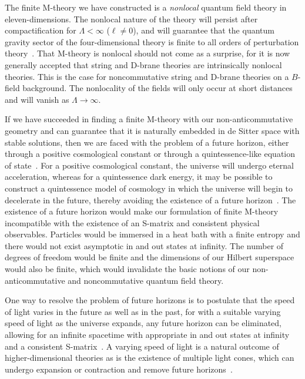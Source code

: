 \documentclass[a4paper,12pt]{article}
\begin{document}
The finite M-theory we have constructed is a {\it nonlocal} quantum field
theory in eleven-dimensions. The nonlocal nature of the theory will
persist after compactification for $\Lambda < \infty$ ($\ell \not= 0$), and
will guarantee that the quantum gravity sector of the four-dimensional
theory is finite to all orders of perturbation theory~\cite{Moffat3}. That
M-theory is nonlocal should not come as a surprise, for it is now generally
accepted that string and D-brane theories are intrinsically nonlocal
theories. This is the case for noncommutative string and
D-brane theories on a $B$-field background. The nonlocality of the fields
will only occur at short distances and will vanish as
$\Lambda\rightarrow\infty$.

If we have succeeded in finding a finite M-theory with our
non-anticommutative geometry and can guarantee that it is naturally
embedded in de Sitter space with stable solutions, then we are faced with
the problem of a future horizon, either through a positive cosmological
constant or through a quintessence-like equation of
state~\cite{Susskind}. For a positive cosmological constant, the
universe will undergo eternal acceleration, whereas for a quintessence dark
energy, it may be possible to construct a quintessence model of cosmology
in which the universe will begin to decelerate in the future, thereby
avoiding the existence of a future horizon~\cite{Cline}. The existence of a
future horizon would make our formulation of finite M-theory incompatible
with the existence of an S-matrix and consistent physical observables.
Particles would be immersed in a heat bath with a finite entropy and there
would not exist asymptotic in and out states at infinity. The number of
degrees of freedom would be finite and the dimensions of our Hilbert
superspace would also be finite, which would invalidate the
basic notions of our non-anticommutative and noncommutative quantum field
theory.

One way to resolve the problem of future horizons is to postulate that the
speed of light varies in the future as well as in the past, for with a
suitable varying speed of light as the universe expands,
any future horizon can be eliminated, allowing for an infinite spacetime
with appropriate in and out states at infinity and a consistent
S-matrix~\cite{Moffat4}. A varying speed of light is a natural outcome of
higher-dimensional theories as is the existence of multiple light cones,
which can undergo expansion or contraction and remove future
horizons~\cite{Clayton,Drummond,Liberati}.
\end{document}
